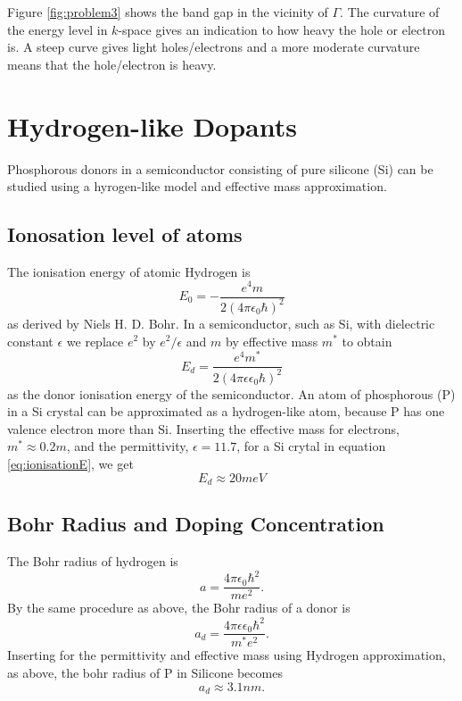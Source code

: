 \documentclass[11pt]{amsart}
\begin{document}
Figure \ref{fig:problem3} shows the band gap in the vicinity of $\Gamma$. The curvature of the energy level in $k$-space gives an indication to how heavy the hole or electron is. A steep curve gives light holes/electrons and a more moderate curvature means that the hole/electron is heavy.

\section{Hydrogen-like Dopants}
Phosphorous donors in a semiconductor consisting of pure silicone (Si) can be studied using a hyrogen-like model and effective mass approximation.

\subsection{Ionosation level of atoms} The ionisation energy of atomic Hydrogen is
\begin{equation}
E_0 = -\frac{e^4m}{2(4\pi\epsilon_0 \hbar)^2}
\end{equation}
as derived by Niels H. D. Bohr. In a semiconductor, such as Si, with dielectric constant $\epsilon$ we replace $e^2$ by $e^2/\epsilon$ and $m$ by effective mass $m^*$ to obtain
\begin{equation}
\label{eq:ionisationE}
E_d = \frac{e^4m^*}{2(4\pi\epsilon\epsilon_0 \hbar)^2}
\end{equation}
as the donor ionisation energy of the semiconductor. An atom of phosphorous (P) in a Si crystal can be approximated as a hydrogen-like atom, because P has one valence electron more than Si. Inserting the effective mass for electrons, $m^*\approx 0.2m$, and the permittivity, $\epsilon = 11.7$, for a Si crytal in equation \ref{eq:ionisationE}, we get
\begin{equation*}
E_d \approx 20meV
\end{equation*}

\subsection{Bohr Radius and Doping Concentration}
The Bohr radius of hydrogen is
\begin{equation}
a = \frac{4\pi\epsilon_0\hbar^2}{me^2}.
\end{equation}
By the same procedure as above, the Bohr radius of a donor is
\begin{equation}
a_d = \frac{4\pi\epsilon\epsilon_0\hbar^2}{m^*e^2}.
\end{equation}
Inserting for the permittivity and effective mass using Hydrogen approximation, as above, the bohr radius of P in Silicone becomes
\begin{equation*}
a_d \approx 3.1nm.
\end{equation*}
\end{document}
